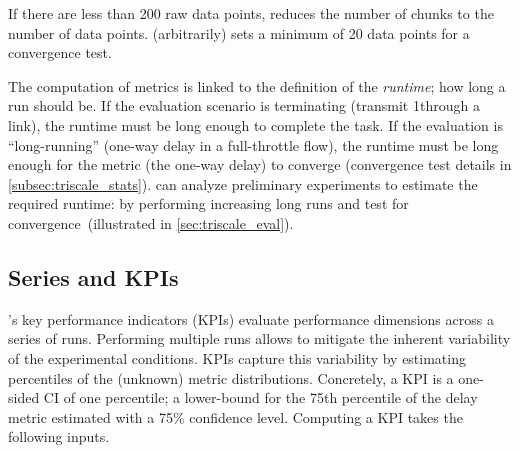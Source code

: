 \begin{remark}
  If there are less than 200 raw data points, \triscale reduces the number of chunks to the number of data points.
  \triscale (arbitrarily) sets a minimum of 20 data points for a convergence test.
\end{remark}


The computation of \triscale metrics is linked to the definition of the \emph{runtime}; \ie how long a run should be.
If the evaluation scenario is terminating (\eg transmit 1\MB through a link), the runtime must be long enough to complete the task.
If the evaluation is ``long-running'' (\eg one-way delay in a full-throttle flow), the runtime must be long enough for the metric (the one-way delay) to converge (convergence test details in \cref{subsec:triscale_stats}).
\triscale can analyze preliminary experiments to estimate the required runtime: by performing increasing long runs and test for convergence~(illustrated in \cref{sec:triscale_eval}).

\subsection{Series and KPIs}
\label{subsec:KPIs}

\triscale's key performance indicators (KPIs) evaluate performance dimensions across a series of runs.
Performing multiple runs allows to mitigate the inherent variability of the experimental conditions.
KPIs capture this variability by estimating percentiles of the (unknown) metric distributions.
Concretely, a \triscale KPI is a one-sided CI of one percentile; \eg a lower-bound for the 75th percentile of the delay metric estimated with a 75\% confidence level.
Computing a KPI takes the following inputs.



